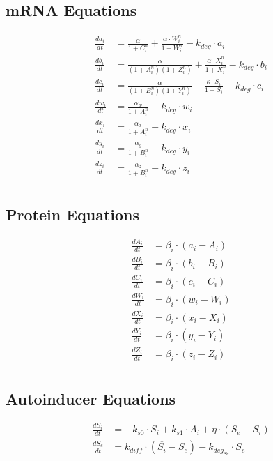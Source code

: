 \documentclass[fleqn]{article} %
\begin{document}
\subsection*{mRNA Equations}
\begin{align*}
\frac{da_i}{dt} &= \frac{\alpha}{1 + C_i^n} +  \frac{\alpha \cdot W_i^n}{1 + W_i^n} - k_{deg} \cdot a_i \\
\frac{db_i}{dt} &= \frac{\alpha}{(1 + A_i^n)(1 + Z_i^n)} + \frac{\alpha \cdot X_i^n}{1 + X_i^n} - k_{deg} \cdot b_i \\
\frac{dc_i}{dt} &= \frac{\alpha}{(1 + B_i^n)(1 + Y_i^n)} + \frac{\kappa \cdot S_i}{1 + S_i} - k_{deg} \cdot c_i \\
\frac{dw_i}{dt} &= \frac{\alpha_w}{1 + A_i^n} - k_{deg} \cdot w_i \\
\frac{dx_i}{dt} &= \frac{\alpha_x}{1 + A_i^n} - k_{deg} \cdot x_i \\
\frac{dy_i}{dt} &= \frac{\alpha_y}{1 + B_i^n} - k_{deg} \cdot y_i \\
\frac{dz_i}{dt} &= \frac{\alpha_z}{1 + B_i^n} - k_{deg} \cdot z_i \\
\end{align*}

\subsection*{Protein Equations}
\begin{align*}
\frac{dA_i}{dt} &= \beta_i \cdot (a_i - A_i) \\
\frac{dB_i}{dt} &= \beta_i \cdot (b_i - B_i) \\
\frac{dC_i}{dt} &= \beta_i \cdot (c_i - C_i) \\
\frac{dW_i}{dt} &= \beta_i \cdot (w_i - W_i) \\
\frac{dX_i}{dt} &= \beta_i \cdot (x_i - X_i) \\
\frac{dY_i}{dt} &= \beta_i \cdot (y_i - Y_i) \\
\frac{dZ_i}{dt} &= \beta_i \cdot (z_i - Z_i) \\
\end{align*}

\subsection*{Autoinducer Equations}
\begin{align*}
\frac{dS_i}{dt} &= -k_{s0} \cdot S_i + k_{s1} \cdot A_i + \eta \cdot (S_e - S_i) \\
\frac{dS_e}{dt} &= k_{diff} \cdot (\overline{S_i} - S_e) - k_{deg_{Se}} \cdot S_e \\
\end{align*}
\end{document}
